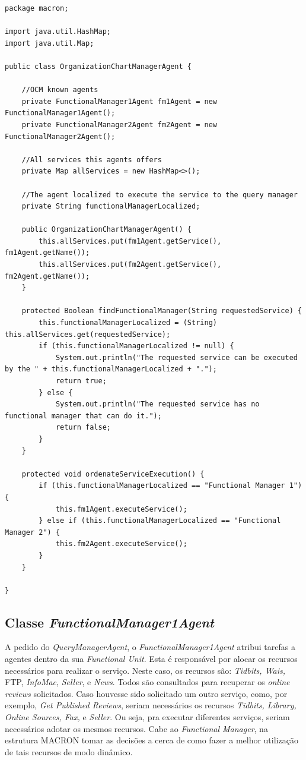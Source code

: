 \begin{lstlisting}
package macron;

import java.util.HashMap;
import java.util.Map;

public class OrganizationChartManagerAgent {
	
	//OCM known agents
	private FunctionalManager1Agent fm1Agent = new FunctionalManager1Agent();
	private FunctionalManager2Agent fm2Agent = new FunctionalManager2Agent();
	
	//All services this agents offers
	private Map allServices = new HashMap<>();
	
	//The agent localized to execute the service to the query manager
	private String functionalManagerLocalized;
	
	public OrganizationChartManagerAgent() {
		this.allServices.put(fm1Agent.getService(), fm1Agent.getName());
		this.allServices.put(fm2Agent.getService(), fm2Agent.getName());
	}
	
	protected Boolean findFunctionalManager(String requestedService) {
		this.functionalManagerLocalized = (String) this.allServices.get(requestedService);
		if (this.functionalManagerLocalized != null) {
			System.out.println("The requested service can be executed by the " + this.functionalManagerLocalized + ".");
			return true;
		} else {
			System.out.println("The requested service has no functional manager that can do it.");
			return false;
		}
	}
	
	protected void ordenateServiceExecution() {
		if (this.functionalManagerLocalized == "Functional Manager 1") {
			this.fm1Agent.executeService();
		} else if (this.functionalManagerLocalized == "Functional Manager 2") {
			this.fm2Agent.executeService();
		}
	}

}
\end{lstlisting}
 
\subsection{Classe \textit{FunctionalManager1Agent}}

A pedido do \textit{QueryManagerAgent}, o \textit{FunctionalManager1Agent} atribui tarefas a agentes dentro da sua \textit{Functional Unit}. Esta é responsável por alocar os recursos necessários para realizar o serviço. Neste caso, os recursos são: \textit{Tidbits, Wais,} FTP, \textit{InfoMac}, \textit{Seller}, e \textit{News}. Todos são consultados para recuperar os \textit{online reviews} solicitados. Caso houvesse sido solicitado um outro serviço, como, por exemplo, \textit{Get Published Reviews}, seriam necessários os recursos \textit{Tidbits, Library, Online Sources, Fax,} e \textit{Seller}. Ou seja, pra executar diferentes serviços, seriam necessários adotar os mesmos recursos. Cabe ao \textit{Functional Manager}, na estrutura MACRON tomar as decisões a cerca de como fazer a melhor utilização de tais recursos de modo dinâmico.


